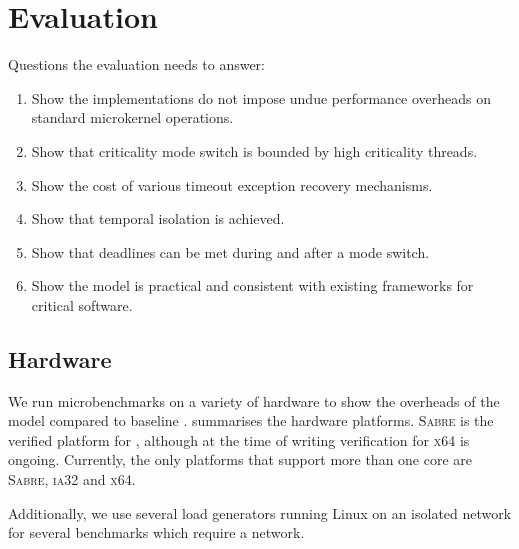 \chapter{Evaluation}
\label{chap:evaluation}

Questions the evaluation needs to answer:

\begin{enumerate}
\item Show the implementations do not impose undue performance overheads on standard microkernel
operations.
\item Show that criticality mode switch is bounded by high criticality threads.
\item Show the cost of various timeout exception recovery mechanisms.
\item Show that temporal isolation is achieved.
\item Show that deadlines can be met during and after a mode switch.
\item Show the model is practical and consistent with existing frameworks for critical software.
\end{enumerate}

\section{Hardware}

We run microbenchmarks on a variety of hardware to show the overheads of the model compared to
baseline \selfour.  summarises the hardware platforms. \textsc{Sabre} is
the verified platform for \selfour, although at the time of writing verification for \textsc{x64} is
ongoing. Currently, the only platforms that support more than one core are \textsc{Sabre},
\textsc{ia32} and \textsc{x64}.

Additionally, we use several load generators running Linux on an isolated network for several
benchmarks which require a network.

